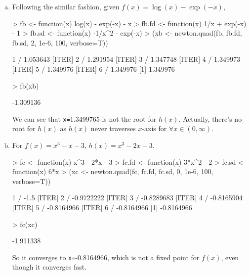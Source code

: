 \documentclass{article}
\begin{document}
\begin{enumerate}[(a)]
    \item Following the similar fashion, given $f(x) = \log(x) - \exp(-x)$,
\begin{Schunk}
\begin{Sinput}
> fb <- function(x) log(x) - exp(-x) - x
> fb.fd <- function(x) 1/x + exp(-x) - 1
> fb.sd <- function(x) -1/x^2 - exp(-x)
> (xb <- newton.quad(fb, fb.fd, fb.sd, 2, 1e-6, 100, verbose=T))
\end{Sinput}
\begin{Soutput}
[ITER] 1 / 1.053643
[ITER] 2 / 1.291954
[ITER] 3 / 1.347748
[ITER] 4 / 1.349973
[ITER] 5 / 1.349976
[ITER] 6 / 1.349976
[1] 1.349976
\end{Soutput}
\begin{Sinput}
> fb(xb)
\end{Sinput}
\begin{Soutput}
[1] -1.309136
\end{Soutput}
\end{Schunk}
    We can see that \verb|x=|1.3499765 is not the root for $h(x)$. Actually, there's no root for $h(x)$ as $h(x)$ never traverses $x$-axis for $\forall x \in (0, \infty)$.

    \item For $f(x) = x^3-x-3$, $h(x) = x^3-2x-3$.
\begin{Schunk}
\begin{Sinput}
> fc <- function(x) x^3 - 2*x - 3
> fc.fd <- function(x) 3*x^2 - 2
> fc.sd <- function(x) 6*x
> (xc <- newton.quad(fc, fc.fd, fc.sd, 0, 1e-6, 100, verbose=T))
\end{Sinput}
\begin{Soutput}
[ITER] 1 / -1.5
[ITER] 2 / -0.9722222
[ITER] 3 / -0.8289683
[ITER] 4 / -0.8165904
[ITER] 5 / -0.8164966
[ITER] 6 / -0.8164966
[1] -0.8164966
\end{Soutput}
\begin{Sinput}
> fc(xc)
\end{Sinput}
\begin{Soutput}
[1] -1.911338
\end{Soutput}
\end{Schunk}
    So it converges to \verb|x=|-0.8164966, which is not a fixed point for $f(x)$, even though it converges fast.


\end{enumerate}
\end{document}
